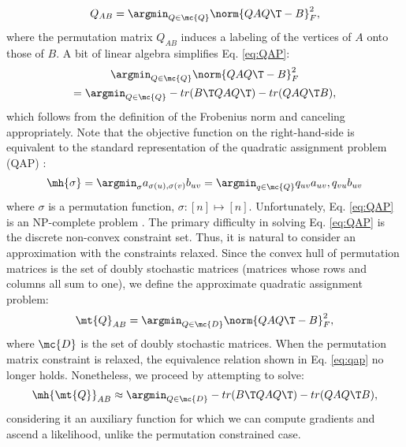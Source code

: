 \documentclass[10pt,journal,cspaper,compsoc]{IEEEtran}
\begin{document}
 \begin{align} \label{eq:QAP}
	Q_{AB}= \argmin_{Q \in \mc{Q}} \norm{Q A Q\T - B}^2_F,
\end{align}
where the permutation matrix $Q_{AB}$ induces a labeling of the vertices of $A$ onto those of $B$. A bit of linear algebra simplifies Eq. \eqref{eq:QAP}: %
\begin{multline} \label{eq:qap}
	\argmin_{Q \in \mc{Q}} \norm{Q A Q\T - B}^2_F \nonumber \\
	= \argmin_{Q \in \mc{Q}} - tr(B\T QAQ\T) - tr(QAQ\T B),			
\end{multline}
which follows from the definition of the Frobenius norm and canceling appropriately.  Note that the objective function on the right-hand-side is equivalent to the standard representation of the quadratic assignment problem (QAP) \cite{Conte2004}:
\begin{align}
	\mh{\sigma}= \argmin_{\sigma} a_{\sigma(u), \sigma(v)} b_{uv} = \argmin_{q \in \mc{Q}} q_{uv} a_{uv}, q_{vu} b_{uv}
\end{align}
where $\sigma$ is a permutation function, $\sigma: [n] \mapsto [n]$.  Unfortunately, Eq. \eqref{eq:QAP} is an NP-complete problem \cite{Garey1979}. The primary difficulty in solving Eq. \eqref{eq:QAP} is the discrete non-convex constraint set.  Thus, it is natural to consider an approximation with the constraints relaxed.  Since the convex hull of permutation matrices is the set of doubly stochastic matrices (matrices whose rows and columns all sum to one), we define the approximate quadratic assignment problem:
\begin{align} \label{eq:tqap}
	\mt{Q}_{AB}= \argmin_{Q \in \mc{D}} \norm{Q A Q\T - B}^2_F,
\end{align}
where $\mc{D}$ is the set of doubly stochastic matrices.  When the permutation matrix constraint is relaxed, the equivalence relation shown in Eq. \eqref{eq:qap} no longer holds.  Nonetheless, we proceed by attempting to solve:
\begin{align} \label{eq:nqap}
	\mh{\mt{Q}}_{AB} \approx \argmin_{Q \in \mc{D}} - tr(B\T QAQ\T) - tr(QAQ\T B),
\end{align}
considering it an auxiliary function for which we can compute gradients and ascend a likelihood, unlike the permutation constrained case.  
\end{document}
